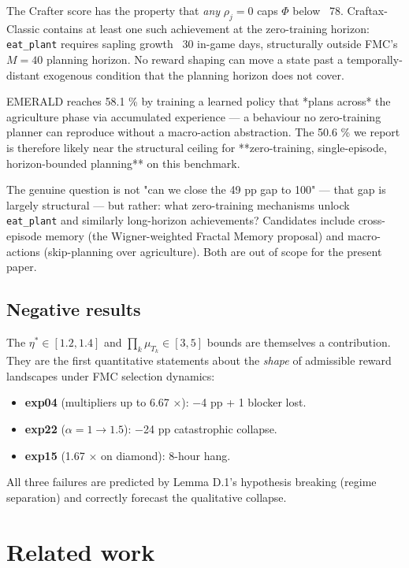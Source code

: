 \documentclass[11pt,letterpaper]{article}
\begin{document}
The Crafter score has the property that \emph{any} $\rho_j = 0$ caps $\Phi$
below ~78. Craftax-Classic contains at least one such achievement at
the zero-training horizon: \texttt{eat\_plant} requires sapling growth ~30
in-game days, structurally outside FMC's $M = 40$ planning horizon.
No reward shaping can move a state past a temporally-distant exogenous
condition that the planning horizon does not cover.

EMERALD reaches 58.1 \% by training a learned policy that *plans
across* the agriculture phase via accumulated experience — a behaviour
no zero-training planner can reproduce without a macro-action
abstraction. The 50.6 \% we report is therefore likely near the
structural ceiling for **zero-training, single-episode, horizon-bounded
planning** on this benchmark.

The genuine question is not "can we close the 49 pp gap to 100" — that
gap is largely structural — but rather: what zero-training mechanisms
unlock \texttt{eat\_plant} and similarly long-horizon achievements? Candidates
include cross-episode memory (the Wigner-weighted Fractal Memory
proposal) and macro-actions (skip-planning over agriculture). Both are
out of scope for the present paper.

\subsection{Negative results}

The $\eta^* \in [1.2, 1.4]$ and $\prod_k \mu_{T_k} \in [3, 5]$ bounds
are themselves a contribution. They are the first quantitative
statements about the \emph{shape} of admissible reward landscapes under
FMC selection dynamics:

\begin{itemize}
\item \textbf{exp04} (multipliers up to 6.67 ×): −4 pp + 1 blocker lost.
\item \textbf{exp22} ($\alpha = 1 \to 1.5$): −24 pp catastrophic collapse.
\item \textbf{exp15} (1.67 × on diamond): 8-hour hang.
\end{itemize}
All three failures are predicted by Lemma D.1's hypothesis breaking
(regime separation) and correctly forecast the qualitative collapse.



\section{Related work}
\end{document}
